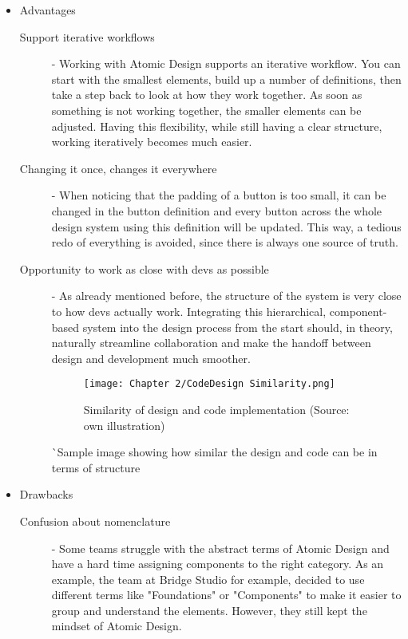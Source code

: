 \begin{itemize}
	\item Advantages
	      \begin{description}
		      \item[Support iterative workflows] - Working with Atomic Design supports an iterative
		            workflow. You can start with the smallest elements, build up a number of
		            definitions, then take a step back to look at how they work together. As soon as
		            something is not working together, the smaller elements can be adjusted. Having
		            this flexibility, while still having a clear structure, working iteratively
		            becomes much easier. 
		      \item[Changing it once, changes it everywhere] - When noticing that the padding
		            of a button is too small, it can be changed in the button definition and every
		            button across the whole design system using this definition will be updated.
		            This way, a tedious redo of everything is avoided, since there is always one
		            source of truth.
		      \item[Opportunity to work as close with devs as possible] - As already mentioned
		            before, the structure of the system is very close to how devs actually work.
		            Integrating this hierarchical, component-based system into the design process
		            from the start should, in theory, naturally streamline collaboration and make
		            the handoff between design and development much smoother.

		            \begin{figure}[h!]
			            \begin{center}
				            \texttt{[image: Chapter 2/CodeDesign Similarity.png]}
				            \caption{Similarity of design and code implementation (Source: own illustration)}
			            \end{center}
		            \end{figure}
		            ^^ Sample image showing how similar the design and code can be in terms of structure
	      \end{description}
	\item Drawbacks
	      \begin{description}
		      \item[Confusion about nomenclature] - Some teams struggle with the abstract terms of
		            Atomic Design and have a hard time assigning components to the right category.
		            As an example, the team at Bridge Studio for example, decided to use different
		            terms like "Foundations" or "Components" to make it easier to group and
		            understand the elements. However, they still kept the mindset of Atomic Design.


\end{description}
\end{itemize}
